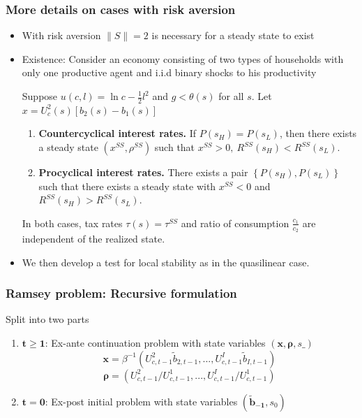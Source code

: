 \documentclass{beamer}
\begin{document}
\begin{frame}\label{risk aversion annex}
\frametitle{More details on cases with risk aversion}
\begin{itemize}
\item With risk aversion $\|S\|=2$ is  necessary for a steady state to exist
\item Existence: Consider an economy consisting of  two types of households with only one productive agent and i.i.d binary shocks to his productivity
\small
\begin{theorem}
\label{thm long run forces}Suppose $u(c,l)=\ln c-\frac{1}{2}%
l^{2}$ and $g<\theta (s)$ for all $%
s.$ Let $x=U^2_c(s)\left[b_2(s)-b_1(s)\right]$

\begin{enumerate}
\item \textbf{Countercyclical interest rates.} If $P \left( s_{H}\right) =P\left( s_{L}\right)$, then
there exists a steady state $\left( x^{SS},\rho ^{SS}\right) $ such that $%
x^{SS}>0,\ R^{SS}\left( s_{H}\right) <R^{SS}\left( s_{L}\right) .$
\item \textbf{Procyclical interest rates.} There exists a pair  $\left\{ P \left( s_{H}\right) ,P\left( s_{L}\right)
\right\} $ such that there exists a steady state with $x^{SS}<0$ and  $R^{SS}\left( s_{H}\right) >R^{SS}\left( s_{L}\right) .$
\end{enumerate}
In both cases, tax rates $\tau(s)=\tau^{SS}$ and ratio of consumption $\frac{c_1}{c_2}$ are independent of the realized state.
\end{theorem}
\item We then develop a test for local stability as in the quasilinear case. \hyperlink{risk aversion}{}

\end{itemize}

\end{frame}





\begin{frame}

\frametitle{Ramsey problem: Recursive formulation}

Split  into two parts

\begin{enumerate}

\item $\mathbf{t\geq1}$: Ex-ante continuation problem with state variables $(\bm{x},\bm{\rho},s\_)$
\[\bm{x}= \beta^{-1}\left( U_{c,t-1}^{2}\tilde{b}_{2,t-1},...,U_{c,t-1}^{I}\tilde{b}_{I,t-1}\right)\]
\[ \bm{\rho }=\left( U_{c,t-1}^{2}/U_{c,t-1}^{1},...,U_{c,t-1}^{I}/U_{c,t-1}^{1}\right) \]
\item $\mathbf{t=0} $: Ex-post initial problem with state variables $(\bm{\tilde{b}_{-1}},s_{0})$
\end{enumerate}

\end{frame}
\end{document}
